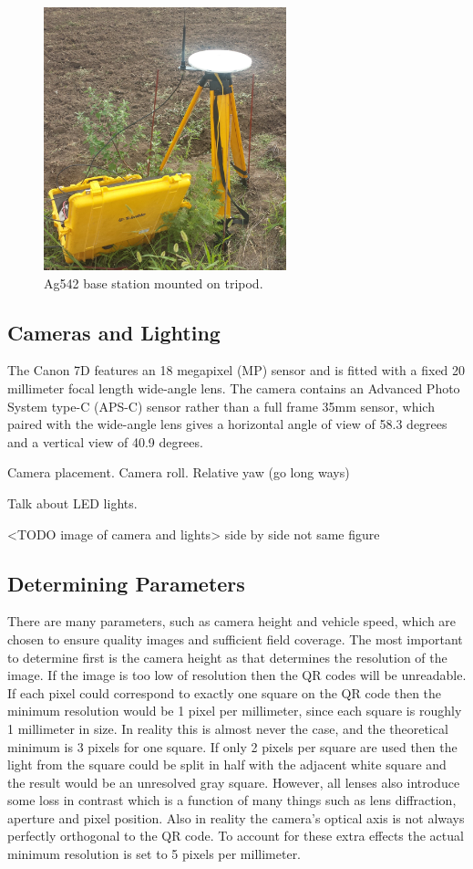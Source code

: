 \begin{figure}[htb]
	\centering
    \includegraphics[height=3in]{figures/sunflower_base_cropped.jpg}
    \caption[Base station]{Ag542 base station mounted on tripod.}
    \label{base_station}
\end{figure}

\subsection{Cameras and Lighting}

The Canon 7D features an 18 megapixel (MP) sensor and is fitted with a fixed 20 millimeter focal length wide-angle lens.  The camera contains an Advanced Photo System type-C (APS-C) sensor rather than a full frame 35mm sensor, which paired with the wide-angle lens gives a horizontal angle of view of 58.3 degrees and a vertical view of 40.9 degrees.  

Camera placement.  Camera roll.  Relative yaw (go long ways)

Talk about LED lights.  

<TODO image of camera and lights> side by side not same figure

\subsection{Determining Parameters}

There are many parameters, such as camera height and vehicle speed, which are chosen to ensure quality images and sufficient field coverage.  The most important to determine first is the camera height as that determines the resolution of the image.  If the image is too low of resolution then the QR codes will be unreadable.  If each pixel could correspond to exactly one square on the QR code then the minimum resolution would be 1 pixel per millimeter, since each square is roughly 1 millimeter in size.  In reality this is almost never the case, and the theoretical minimum is 3 pixels for one square.  If only 2 pixels per square are used then the light from the square could be split in half with the adjacent white square and the result would be an unresolved gray square.  However, all lenses also introduce some loss in contrast which is a function of many things such as lens diffraction, aperture and pixel position.  Also in reality the camera's optical axis is not always perfectly orthogonal to the QR code.  To account for these extra effects the actual minimum resolution is set to 5 pixels per millimeter.  

